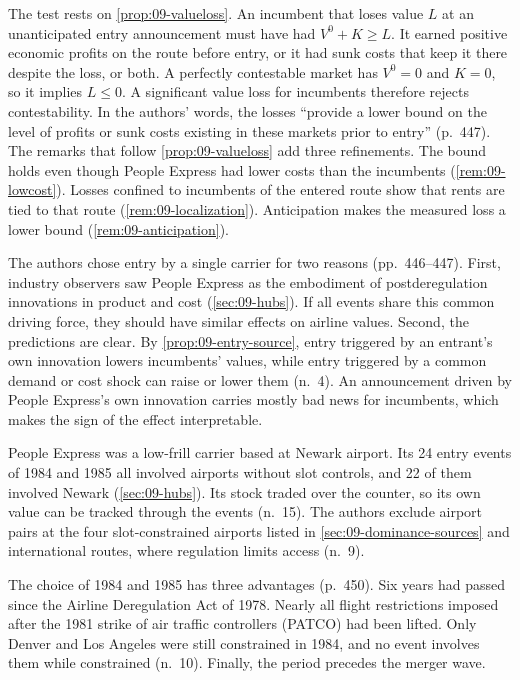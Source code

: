 The test rests on \cref{prop:09-valueloss}. An incumbent that loses value $L$ at an unanticipated entry
announcement must have had $V^0+K\ge L$. It earned positive economic profits on the route before entry,
or it had sunk costs that keep it there despite the loss, or both. A perfectly contestable market has $V^0=0$ and $K=0$, so it
implies $L\le0$. A significant value loss for incumbents therefore rejects contestability. In the
authors' words, the losses ``provide a lower bound on the level of profits or sunk costs existing in
these markets prior to entry'' (p.~447). The remarks that follow \cref{prop:09-valueloss} add three
refinements. The bound holds even though People Express had lower costs than the incumbents
(\cref{rem:09-lowcost}). Losses confined to incumbents of the entered route show that rents are tied to
that route (\cref{rem:09-localization}). Anticipation makes the measured loss a lower bound
(\cref{rem:09-anticipation}).

The authors chose entry by a single carrier for two reasons (pp.~446--447). First, industry observers saw
People Express as the embodiment of postderegulation innovations in product and cost (\cref{sec:09-hubs}).
If all events share this common driving force, they should have similar effects on airline values. Second,
the predictions are clear. By \cref{prop:09-entry-source}, entry triggered by an entrant's own innovation
lowers incumbents' values, while entry triggered by a common demand or cost shock can raise or lower them
(n.~4). An announcement driven by People Express's own innovation carries mostly bad news for incumbents,
which makes the sign of the effect interpretable.

People Express was a low-frill carrier based at Newark airport. Its 24 entry events of 1984 and 1985 all
involved airports without slot controls, and 22 of them involved Newark (\cref{sec:09-hubs}). Its stock
traded over the counter, so its own value can be tracked through the events (n.~15). The authors exclude airport pairs at the four slot-constrained airports listed in
\cref{sec:09-dominance-sources} and international routes, where regulation limits access (n.~9).

The choice of 1984 and 1985 has three advantages (p.~450). Six years had passed since the
Airline Deregulation Act of 1978. Nearly all flight restrictions imposed after the 1981 strike of air
traffic controllers (PATCO) had been lifted. Only Denver and Los Angeles were still constrained in
1984, and no event involves them while constrained (n.~10). Finally, the period precedes the
merger wave.

